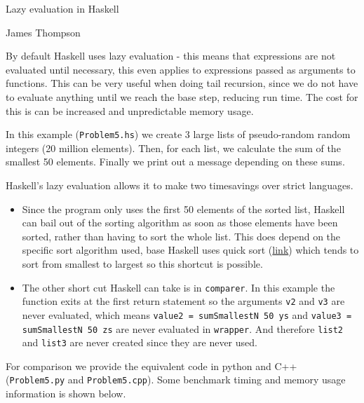 \documentclass[a4paper,10pt]{article}
\begin{document}
\begin{LARGE}
	\begin{center}
		Lazy evaluation in Haskell
	\end{center}
\end{LARGE}

\begin{Large}
	\begin{center}
		James Thompson
	\end{center}
\end{Large}

By default Haskell uses lazy evaluation - this means that expressions are not evaluated until necessary, this even applies to expressions passed as arguments to functions. This can be very useful when doing tail recursion, since we do not have to evaluate anything until we reach the base step, reducing run time. The cost for this is can be increased and unpredictable memory usage.

\vspace{5pt}
In this example (\texttt{Problem5.hs}) we create 3 large lists of pseudo-random random integers (20 million elements). Then, for each list, we calculate the sum of the smallest 50 elements. Finally we print out a message depending on these sums.

\noindent Haskell's lazy evaluation allows it to make two timesavings over strict languages.
\begin{itemize}
	\item Since the program only uses the first 50 elements of the sorted list, Haskell can bail out of the sorting algorithm as soon as those elements have been sorted, rather than having to sort the whole list. This does depend on the specific sort algorithm used, base Haskell uses quick sort (\href{https://hackage.haskell.org/package/base-4.14.1.0/docs/src/Data.OldList.html\#sort}{link}) which tends to sort from smallest to largest so this shortcut is possible.

	\item The other short cut Haskell can take is in \texttt{comparer}. In this example the function exits at the first return statement so the arguments \texttt{v2} and \texttt{v3} are never evaluated, which means \texttt{value2 = sumSmallestN 50 ys} and \texttt{value3 = sumSmallestN 50 zs} are never evaluated in \texttt{wrapper}. And therefore \texttt{list2} and \texttt{list3} are never created since they are never used.
\end{itemize}

\vspace{10pt}
For comparison we provide the equivalent code in python and C++ (\texttt{Problem5.py} and \texttt{Problem5.cpp}).  Some benchmark timing and memory usage information is shown below.
\end{document}
